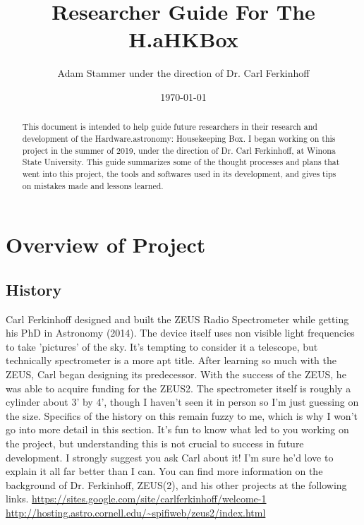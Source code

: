 \documentclass[prb,preprint]{revtex4-1}
\begin{document}
\title{Researcher Guide For The H.aHKBox}
\author{Adam Stammer under the direction of Dr. Carl Ferkinhoff}

\date{\today}

\begin{abstract}
This document is intended to help guide future researchers in their research and development of the Hardware.astronomy: Housekeeping Box. I began working on this project in the summer of 2019, under the direction of Dr. Carl Ferkinhoff, at Winona State University. This guide summarizes some of the thought processes and plans that went into this project, the tools and softwares used in its development, and gives tips on mistakes made and lessons learned.
\end{abstract}

\maketitle


\section{Overview of Project}
\subsection{History}
Carl Ferkinhoff designed and built the ZEUS Radio Spectrometer while getting his PhD in Astronomy (2014). The device itself uses non visible light frequencies to take 'pictures' of the sky. It's tempting to consider it a telescope, but technically spectrometer is a more apt title. After learning so much with the ZEUS, Carl began designing its predecessor. With the success of the ZEUS, he was able to acquire funding for the ZEUS2. The spectrometer itself is roughly a cylinder about 3' by 4', though I haven't seen it in person so I'm just guessing on the size. Specifics of the history on this remain fuzzy to me, which is why I won't go into more detail in this section. It's fun to know what led to you working on the project, but understanding this is not crucial to success in future development. I strongly suggest you ask Carl about it! I'm sure he'd love to explain it all far better than I can. You can find more information on the background of Dr. Ferkinhoff, ZEUS(2), and his other projects at the following links. \url{https://sites.google.com/site/carlferkinhoff/welcome-1} \newline \url{http://hosting.astro.cornell.edu/~spifiweb/zeus2/index.html}
\end{document}
